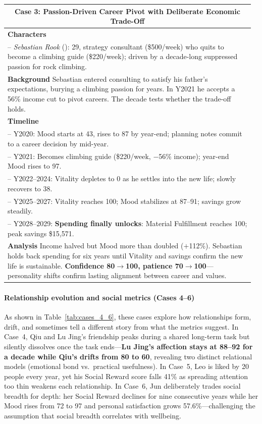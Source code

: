 \begin{table}[htbp]
\begin{tabular}{p{0.97\linewidth}}
\multicolumn{1}{c}{\textbf{Case 3: Passion-Driven Career Pivot with Deliberate Economic Trade-Off}}\\
\midrule
\textbf{Characters}\\
\quad -- \textit{Sebastian Rook} (\apartment{}): 29, strategy consultant (\$500/week)
  who quits to become a climbing guide (\$220/week);
  driven by a decade-long suppressed passion for rock climbing.\\[2pt]
\textbf{Background}\quad
Sebastian entered consulting to satisfy his father's expectations,
burying a climbing passion for years.
In Y2021 he accepts a 56\% income cut to pivot careers.
The decade tests whether the trade-off holds.\\[2pt]
\textbf{Timeline}\\
\quad -- Y2020: Mood starts at 43, rises to 87 by year-end;
  planning notes commit to a career decision by mid-year.\\
\quad -- Y2021: Becomes climbing guide (\$220/week, $-$56\% income);
  year-end Mood rises to 97.\\
\quad -- Y2022--2024: Vitality depletes to 0 as he settles into the new life;
  slowly recovers to 38.\\
\quad -- Y2025--2027: Vitality reaches 100; Mood stabilizes at 87--91;
  savings grow steadily.\\
\quad -- Y2028--2029: \textbf{Spending finally unlocks}: Material Fulfillment reaches 100;
  peak savings \$15,571.\\[2pt]
\textbf{Analysis}\quad
Income halved but Mood more than doubled ($+$112\%).
Sebastian holds back spending for six years until Vitality and savings confirm the new
life is sustainable.
\textbf{Confidence 80$\to$100, patience 70$\to$100}---personality shifts confirm lasting
alignment between career and values.\\

\bottomrule
\end{tabular}
\end{table}


\paragraph{Relationship evolution and social metrics (Cases 4--6)}
As shown in Table~\ref{tab:cases_4_6}, these cases explore how relationships form, drift, and sometimes tell a different story from what the metrics suggest.
In Case~4, Qiu and Lu Jing's friendship peaks during a shared long-term task
but silently dissolves once the task ends---\textbf{Lu Jing's affection stays at 88--92 for a decade while Qiu's drifts from 80 to 60},
revealing two distinct relational models (emotional bond vs.\ practical usefulness).
In Case~5, Leo is liked by 20 people every year,
yet his Social Reward score falls 41\% as spreading attention too thin weakens each relationship.
In Case~6, Jun deliberately trades social breadth for depth:
her Social Reward declines for nine consecutive years
while her Mood rises from 72 to 97 and personal satisfaction grows 57.6\%---challenging the assumption that social breadth correlates with wellbeing.

